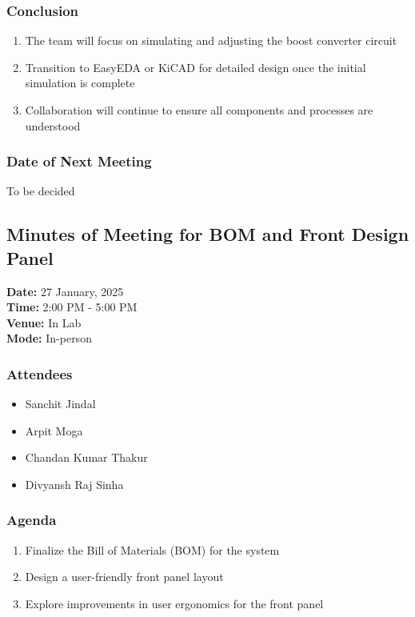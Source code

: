 \documentclass[12pt,a4paper]{article}
\begin{document}
\subsubsection*{Conclusion}
\begin{enumerate}
    \item The team will focus on simulating and adjusting the boost converter circuit
    \item Transition to EasyEDA or KiCAD for detailed design once the initial simulation is complete
    \item Collaboration will continue to ensure all components
and processes are understood
\end{enumerate}
 


\subsubsection*{Date of Next Meeting}
To be decided

\newpage
\subsection*{Minutes of Meeting for BOM and Front Design Panel}

\noindent
\textbf{Date:} 27 January, 2025 \\
\textbf{Time:} 2:00 PM - 5:00 PM \\
\textbf{Venue:} In Lab \\
\textbf{Mode:} In-person \\

\subsubsection*{Attendees}
\begin{itemize}
    \item Sanchit Jindal
    \item Arpit Moga
    \item Chandan Kumar Thakur
    \item Divyansh Raj Sinha
\end{itemize}

\subsubsection*{Agenda}
\begin{enumerate}
    \item Finalize the Bill of Materials (BOM) for the system
    \item Design a user-friendly front panel layout
    \item Explore improvements in user ergonomics for the front panel
\end{enumerate}
\end{document}

